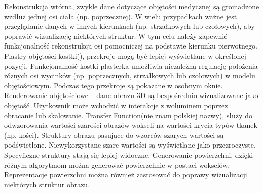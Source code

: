 Rekonstrukcja wtórna, zwykle dane dotyczące objętości medycznej są gromadzone wzdłuż jednej osi ciała (np. poprzecznej).
W wielu przypadkach ważne jest przeglądanie danych w innych kierunkach (np. strzałkowych lub czołowych), aby poprawić wizualizację niektórych struktur.
W tym celu należy zapewnić funkcjonalność rekonstrukcji osi pomocniczej na podstawie kierunku pierwotnego.
Plastry objętości kostki(), przekroje mogą być lepiej wyświetlane w określonej pozycji.
Funkcjonalność kostki plasterka umożliwia niezależną regulację położenia różnych osi wycinków (np. poprzecznych, strzałkowych lub czołowych) w modelu objętościowym.
Podczas tego przekroje są pokazane w osobnym oknie.
Renderowanie objętościowe – dane obrazu 3D są bezpośrednio wizualizowane jako objętość.
Użytkownik może wchodzić w interakcje z woluminem poprzez obracanie lub skalowanie.
Transfer Function(nie znam polskiej nazwy), służy do odwzorowania wartości szarości obrazów wokseli na wartości krycia typów tkanek (np. kości). Struktury obrazu pasujące do wzorców szarych wartości są podświetlone. Niewykorzystane szare wartości są wyświetlane jako
przezroczyste. Specyficzne struktury stają się lepiej widoczne.
Generowanie powierzchni, dzięki różnym algorytmom można generować powierzchnie w postaci wokselów. Reprezentacje powierzchni można również zastosować do poprawy wizualizacji niektórych struktur obrazu.